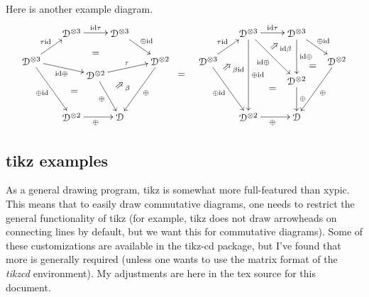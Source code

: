 \documentclass[11pt,oneside,draft]{amsart}
\begin{document}
Here is another example diagram.
\newcommand{\Anglearrow}[1]{\rotatebox{#1}{$\Rightarrow$}}
\[ 
  \begin{xy}
    0;<.95mm,0mm>:<0mm,1mm>:: %
    (3,-10)*+{\cD^{\otimes 3}}="00";
    (18,0)*+{\cD^{\otimes 3}}="10";
    (36,0)*+{\cD^{\otimes 3}}="20";
    (51,-10)*+{\cD^{\otimes 2}}="30";
    (27,-15)*+{\cD^{\otimes 2}}="11";
    (18,-30)*+{\cD^{\otimes 2}}="12";
    (36,-30)*+{\cD}="33";
    (69,-10)*+{\cD^{\otimes 3}}="40";
    (84,0)*+{\cD^{\otimes 3}}="50";
    (102,0)*+{\cD^{\otimes 3}}="60";
    (117,-10)*+{\cD^{\otimes 2}}="70";
    (84,-30)*+{\cD^{\otimes 2}}="52";
    (102,-30)*+{\cD}="73";
    (102,-17)*+{\cD^{\otimes 2}}="63";
    {\ar^{\scriptstyle \tau \id} "00"; "10"};
    {\ar^{\scriptstyle \tau \id} "40"; "50"};
    {\ar^{\scriptstyle \id \tau } "10"; "20"};
    {\ar^{\scriptstyle \id \tau } "50"; "60"};
    {\ar^{\scriptstyle \oplus \id} "20"; "30"};
    {\ar^{\scriptstyle \oplus \id} "60"; "70"};
    {\ar^{\scriptstyle \oplus} "30"; "33"};
    {\ar^{\scriptstyle \oplus} "70"; "73"};
    {\ar_{\scriptstyle \oplus \id} "00"; "12"};
    {\ar_{\scriptstyle \oplus \id} "40"; "52"};
    {\ar_{\scriptstyle \oplus} "12"; "33"};
    {\ar_{\scriptstyle \oplus} "52"; "73"};
    {\ar_{\scriptstyle \id \oplus} "00"; "11"};
    {\ar^{\scriptstyle \tau} "11"; "30"};
    {\ar_{\scriptstyle \oplus} "11"; "33"};
    {\ar^{\scriptstyle \oplus \id} "50"; "52"};
    {\ar_{\scriptstyle \id \oplus} "50"; "63"};
    {\ar^{\scriptstyle \id \oplus} "60"; "63"};
    {\ar^{\scriptstyle \oplus} "63"; "73"};
    (27,-7.5)*{=}; (19,-21)*{=}; (108,-12)*{=}; (93,-20)*{=}; (59,-15)*{=};
    (37,-19)*{\scriptstyle \Anglearrow{40} \beta}; 
    (78.4,-12.5)*{\scriptstyle \Anglearrow{40} \beta \id}; 
    (96,-5)*{\scriptstyle \Anglearrow{40} \id \beta};
  \end{xy}
\]


\subsection{tikz examples}

As a general drawing program, tikz is somewhat more full-featured than
xypic.  This means that to easily draw commutative diagrams, one needs
to restrict the general functionality of tikz (for example, tikz does
not draw arrowheads on connecting lines by default, but we want this
for commutative diagrams).  Some of these customizations are available
in the tikz-cd package, but I've found that more is generally required
(unless one wants to use the matrix format of the \emph{tikzcd}
environment).  My adjustments are here in the tex source for this document.
\end{document}
